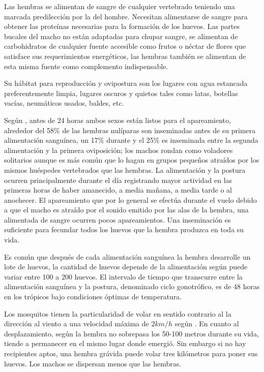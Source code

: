 Las hembras se alimentan de sangre de cualquier vertebrado teniendo una marcada predilección por la del hombre.
Necesitan alimentarse de sangre para obtener las proteínas necesarias para la formación de los huevos. Las partes
bucales del macho no están adaptadas para chupar sangre, se alimentan de carbohidratos de cualquier fuente
accesible como frutos o néctar de flores que satisface sus requerimientos energéticos, las hembras también se
alimentan de esta misma fuente como complemento indispensable\cite{ThironIzcazaJ2003}.

Su hábitat para reproducción y ovipostura son los lugares con agua estancada preferentemente limpia, lugares
oscuros y quietos tales como latas, botellas vacías, neumáticos usados, baldes, etc.

Según \cite{ThironIzcazaJ2003}, antes de 24 horas ambos sexos están listos para el apareamiento, alrededor del 
58\% de las hembras nulíparas son inseminadas antes de su primera alimentación sanguínea, un 17\% durante y el 
25\% es inseminada entre la segunda alimentación y la primera oviposición; los machos rondan como voladores
solitarios aunque es más común que lo hagan en grupos pequeños atraídos por los mismos huéspedes vertebrados 
que las hembras. La alimentación y la postura ocurren principalmente durante el día registrando mayor actividad
en las primeras horas de haber amanecido, a media mañana, a media tarde o al anochecer. El apareamiento que por
lo general se efectúa durante el vuelo debido a que el macho es atraído por el sonido emitido por las alas de la
hembra, una alimentada de sangre ocurren pocos apareamientos. Una inseminación es suficiente para fecundar todos
los huevos que la hembra produzca en toda su vida\cite{ThironIzcazaJ2003}. 

Es común que después de cada alimentación sanguínea la hembra desarrolle un lote de huevos, la cantidad de 
huevos depende de la alimentación según \cite{cabezas2005dengue} puede variar entre 100 a 200 huevos. El
intervalo de tiempo que transcurre entre la alimentación sanguínea y la postura, denominado ciclo gonotrófico, 
es de 48 horas en los trópicos bajo condiciones óptimas de temperatura\cite{ThironIzcazaJ2003}. 

Los mosquitos tienen la particularidad de volar en sentido contrario al la dirección al viento a una
velocidad máxima de $2 km/h$ según \cite{web-site:speedAnimals}. En cuanto al desplazamiento, según 
\cite{cabezas2005dengue} la hembra no sobrepasa los 50-100 metros durante su vida, tiende a permanecer en el
mismo lugar donde emergió. Sin embargo si no hay recipientes aptos, una hembra grávida puede volar tres
kilómetros para poner sus huevos. Los machos se dispersan menos que las hembras.
